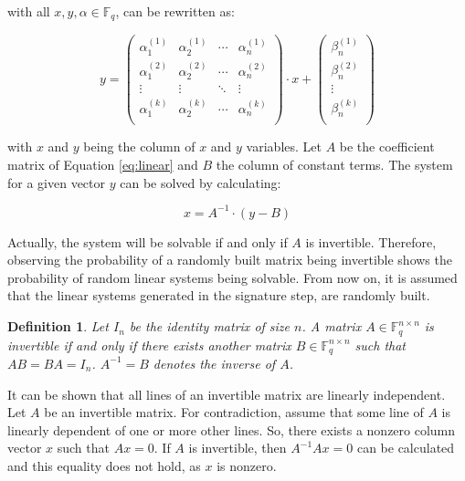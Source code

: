 \documentclass{ufsctex/ufsctex}
\newtheorem{definition}{Definition}
\begin{document}
with all $x, y, \alpha \in \mathbb{F}_q$, can be rewritten as:

\begin{equation}\label{eq:linear}
y =
\begin{pmatrix}
\alpha^{(1)}_1 & \alpha^{(1)}_2 & \cdots & \alpha^{(1)}_n \\
\alpha^{(2)}_1 & \alpha^{(2)}_2 & \cdots & \alpha^{(2)}_n \\
\vdots & \vdots & \ddots & \vdots \\
\alpha^{(k)}_1 & \alpha^{(k)}_2 & \cdots & \alpha^{(k)}_n \\
\end{pmatrix}
\cdot x +
\begin{pmatrix}
\beta^{(1)}_n \\
\beta^{(2)}_n \\
\vdots \\
\beta^{(k)}_n \\
\end{pmatrix}
\end{equation}

with $x$ and $y$ being the column of $x$ and $y$ variables. Let $A$ be the
coefficient matrix of Equation \ref{eq:linear} and $B$ the column of constant
terms. The system for a given vector $y$ can be solved by calculating:

\begin{equation}
x = A^{-1} \cdot (y - B)
\end{equation}

Actually, the system will be solvable if and only if $A$ is invertible.
Therefore, observing the probability of a randomly built matrix being
invertible shows the probability of random linear systems being solvable. From
now on, it is assumed that the linear systems generated in the signature step,
are randomly built.

\begin{definition}
Let $I_n$ be the identity matrix of size $n$. A matrix $A \in \mathbb{F}^{n
\times n}_q$ is invertible if and only if there exists another matrix $B \in
\mathbb{F}^{n \times n}_q$ such that $AB = BA = I_n$. $A^{-1} = B$ denotes the
inverse of $A$.
\end{definition}

It can be shown that all lines of an invertible matrix are linearly
independent. Let $A$ be an invertible matrix. For contradiction, assume that
some line of $A$ is linearly dependent of one or more other lines. So, there
exists a nonzero column vector $x$ such that $Ax = 0$. If $A$ is invertible,
then $A^{-1}Ax = 0$ can be calculated and this equality does not hold, as $x$
is nonzero.
\end{document}
